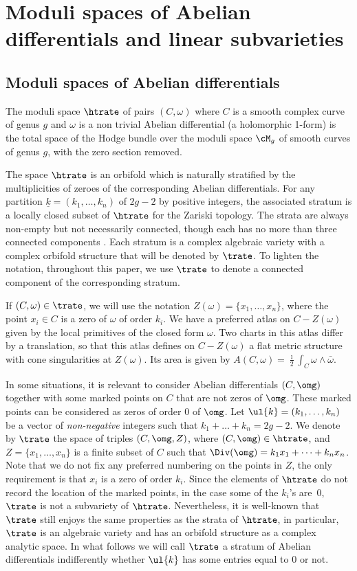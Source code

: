 \section{Moduli spaces of Abelian differentials and linear subvarieties}\label{sec:strate:n:lin:subvar}
\subsection{Moduli spaces of Abelian differentials}\label{subsec:strate:abel}
The moduli space $\htrate$ of pairs $(C, \omega)$ where $C$ is a smooth complex curve of genus $g$ and $\omega$ is a non trivial Abelian differential (\ie a holomorphic 1-form) is the total space of the Hodge bundle over the moduli space $\cM_g$ of smooth curves of genus $g$, with the zero section removed.

The space $\htrate$ is an orbifold which is naturally stratified by the multiplicities of zeroes of the corresponding Abelian differentials. For any partition $\underline k=(k_1,\dots,k_n)$ of $ 2g - 2$ by positive integers, the associated stratum is a locally closed subset of $\htrate$ for the Zariski topology. The strata are always non-empty but not necessarily connected, though each has no more than three connected components \cite{KZ03}. Each stratum is a complex algebraic variety with a complex orbifold structure that will be denoted by $\trate$. To lighten the notation, throughout this paper, we use $\trate$ to denote a connected component of the corresponding stratum.

If $(C,\omega)\in\trate$, we will use the notation $Z(\omega)=\{x_1,\dots,x_n\}$, where the point $x_i\in C$ is a zero of $\omega$ of order $k_i$. We have a preferred atlas on $C - Z(\omega)$ given by the local primitives of the closed form $\omega$. Two charts in this atlas differ by a translation, so that this atlas defines on $C - Z(\omega)$ a flat metric structure with cone singularities at $Z(\omega)$. Its area is given by $A(C, \omega) = \frac{\imath}{2} \int_C \omega \wedge \bar \omega$.

In some situations, it is relevant to consider Abelian differentials $(C,\omg)$ together with some marked points on $C$ that are not zeros of $\omg$. These marked points can be considered as zeros of order $0$ of $\omg$. Let $\ul{k}=(k_1,\dots,k_n)$ be a vector of \emph{non-negative} integers such that $k_1+\dots+k_n=2g-2$. We denote by $\trate$ the space of triples $(C,\omg,Z)$, where $(C,\omg)\in \htrate$, and $Z=\{x_1,\dots,x_n\}$ is a finite subset of $C$ such that $\Div(\omg)=k_1x_1+\dots+k_nx_n$. Note that we do not fix any preferred numbering on the points in $Z$, the only requirement is that $x_i$ is a zero of order $k_i$.
Since the elements of $\htrate$ do not record the location of the marked points, in the case some of the $k_i$'s are~$0$, $\trate$ is not a subvariety of $\htrate$.
Nevertheless, it is well-known that $\trate$ still enjoys the same properties as the strata of $\htrate$, in particular, $\trate$ is an algebraic variety and has an orbifold structure as a complex analytic space.
In what follows we will call $\trate$ a stratum of Abelian differentials indifferently whether $\ul{k}$ has some entries equal to $0$ or not.\enlargethispage{.5\baselineskip}%

